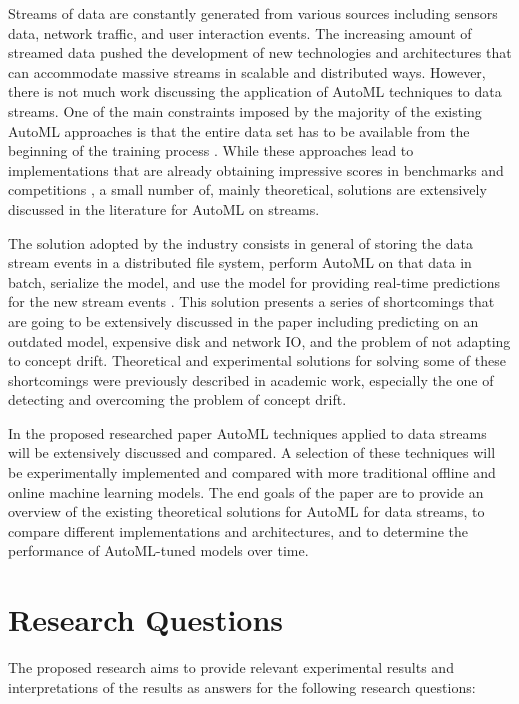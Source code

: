 \documentclass{sig-alternate-br}
\begin{document}
Streams of data are constantly generated from various sources including sensors data, network traffic, and user interaction events. The increasing amount of streamed data pushed the development of new technologies and architectures that can accommodate massive streams in scalable and distributed ways. However, there is not much work discussing the application of AutoML techniques to data streams. One of the main constraints imposed by the majority of the existing AutoML approaches is that the entire data set has to be available from the beginning of the training process \cite{quanming2018taking, truong2019towards}. While these approaches lead to implementations that are already obtaining impressive scores in benchmarks and competitions \cite{gijsbers2019open}, a small number of, mainly theoretical, solutions are extensively discussed in the literature \cite{rossi2014metastream, rossi2017guidance, van2014algorithm} for AutoML on streams.

The solution adopted by the industry consists in general of storing the data stream events in a distributed file system, perform AutoML on that data in batch, serialize the model, and use the model for providing real-time predictions for the new stream events \cite{uber2017michelangelo}. This solution presents a series of shortcomings that are going to be extensively discussed in the paper including predicting on an outdated model, expensive disk and network IO, and the problem of not adapting to concept drift. Theoretical and experimental solutions for solving some of these shortcomings were previously described in academic work, especially the one of detecting \cite{pinto2019automatic} and overcoming \cite{madrid2019towards} the problem of concept drift.

In the proposed researched paper AutoML techniques applied to data streams will be extensively discussed and compared. A selection of these techniques will be experimentally implemented and compared with more traditional offline and online machine learning models. The end goals of the paper are to provide an overview of the existing theoretical solutions for AutoML for data streams, to compare different implementations and architectures, and to determine the performance of AutoML-tuned models over time. 

\section{Research Questions}
The proposed research aims to provide relevant experimental results and interpretations of the results as answers for the following research questions: 
\end{document}
